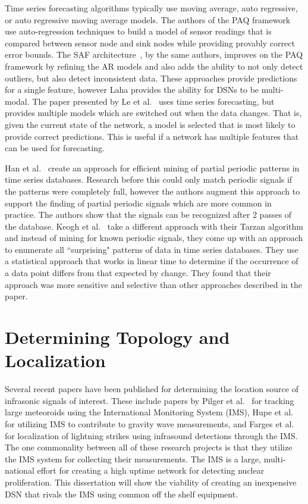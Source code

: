 Time series forecasting algorithms typically use moving average, auto regressive, or auto regressive moving average models. The authors of the PAQ framework~\cite{tulone2006paq} use auto-regression techniques to build a model of sensor readings that is compared between sensor node and sink nodes while  providing provably correct error bounds. The SAF architecture~\cite{tulone2006energy}, by the same authors, improves on the PAQ framework by refining the AR models and also adds the ability to not only detect outliers, but also detect inconsistent data. These approaches provide predictions for a single feature, however Laha provides the ability for DSNs to be multi-modal. The paper presented by Le et al.~\cite{le2007adaptive} uses time series forecasting, but provides multiple models which are switched out when the data changes. That is, given the current state of the network, a model is selected that is most likely to provide correct predictions. This is useful if a network has multiple features that can be used for forecasting.

Han et al.~\cite{han1999efficient} create an approach for efficient mining of partial periodic patterns in time series databases. Research before this could only match periodic signals if the patterns were completely full, however the authors augment this approach to support the finding of partial periodic signals which are more common in practice. The authors show that the signals can be recognized after 2 passes of the database. Keogh et al.~\cite{keogh2002finding} take a different approach with their Tarzan algorithm and instead of mining for known periodic signals, they come up with an approach to enumerate all ``surprising" patterns of data in time series databases. They use a statistical approach that works in linear time to determine if the occurrence of a data point differs from that expected by change. They found that their approach was more sensitive and selective than other approaches described in the paper.

\section{Determining Topology and Localization}\label{sec:determining-topology-and-localization}

Several recent papers have been published for determining the location source of infrasonic signals of interest. These include papers by Pilger et al.~\cite{pilger2019large} for tracking large meteoroids using the International Monitoring System (IMS), Hupe et al.~\cite{hupe2019can} for utilizing IMS to contribute to gravity wave measurements, and Farges et al.~\cite{farges2019infrasound} for localization of lightning strikes using infrasound detections through the IMS. The one commonality between all of these research projects is that they utilize the IMS system for collecting their measurements. The IMS is a large, multi-national effort for creating a high uptime network for detecting nuclear proliferation. This dissertation will show the viability of creating an inexpensive DSN that rivals the IMS using common off the shelf equipment.


